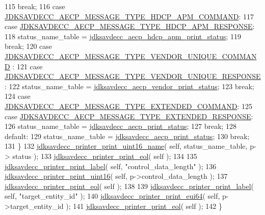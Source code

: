 \begin{DoxyCode}
115         \textcolor{keywordflow}{break};
116     \textcolor{keywordflow}{case} \hyperlink{group__aecp__message__type_gad8bc8a9baa1622bd8eb8077cfc7683da}{JDKSAVDECC\_AECP\_MESSAGE\_TYPE\_HDCP\_APM\_COMMAND}:
117     \textcolor{keywordflow}{case} \hyperlink{group__aecp__message__type_gabea02eb162583796abf33a90b4f7bc4f}{JDKSAVDECC\_AECP\_MESSAGE\_TYPE\_HDCP\_APM\_RESPONSE}:
118         status\_name\_table = \hyperlink{group__aecp__print_gabd6228d42e89612d3e6f1753949893e6}{jdksavdecc\_aecp\_hdcp\_apm\_print\_status};
119         \textcolor{keywordflow}{break};
120     \textcolor{keywordflow}{case} \hyperlink{group__aecp__message__type_gacab73895959eb753b503adc28096fdd5}{JDKSAVDECC\_AECP\_MESSAGE\_TYPE\_VENDOR\_UNIQUE\_COMMAND}
      :
121     \textcolor{keywordflow}{case} \hyperlink{group__aecp__message__type_ga0ae19013f80cab20e33bdc804b7f1364}{JDKSAVDECC\_AECP\_MESSAGE\_TYPE\_VENDOR\_UNIQUE\_RESPONSE}
      :
122         status\_name\_table = \hyperlink{group__aecp__print_gaca25183a2710580e271aa36225535463}{jdksavdecc\_aecp\_vendor\_print\_status};
123         \textcolor{keywordflow}{break};
124     \textcolor{keywordflow}{case} \hyperlink{group__aecp__message__type_ga3e49dd85a1e6d1ef5f18fad578c048f4}{JDKSAVDECC\_AECP\_MESSAGE\_TYPE\_EXTENDED\_COMMAND}:
125     \textcolor{keywordflow}{case} \hyperlink{group__aecp__message__type_ga81cc685902a06aa709023d5e9283d097}{JDKSAVDECC\_AECP\_MESSAGE\_TYPE\_EXTENDED\_RESPONSE}:
126         status\_name\_table = \hyperlink{group__aecp__print_ga3f478fcbbe933768f463bef56b4d98a8}{jdksavdecc\_aecp\_print\_status};
127         \textcolor{keywordflow}{break};
128     \textcolor{keywordflow}{default}:
129         status\_name\_table = \hyperlink{group__aecp__print_ga3f478fcbbe933768f463bef56b4d98a8}{jdksavdecc\_aecp\_print\_status};
130         \textcolor{keywordflow}{break};
131     \}
132     \hyperlink{group__util_ga62486d864a66773d19bbbe23cebf346a}{jdksavdecc\_printer\_print\_uint16\_name}( \textcolor{keyword}{self}, status\_name\_table, p->
      status );
133     \hyperlink{group__util_gacda56c9d3d24593a52c999682fa6e6e3}{jdksavdecc\_printer\_print\_eol}( \textcolor{keyword}{self} );
134 
135     \hyperlink{group__util_gaf7818b24143b3c7502926a425a242ff5}{jdksavdecc\_printer\_print\_label}( \textcolor{keyword}{self}, \textcolor{stringliteral}{"control\_data\_length"} );
136     \hyperlink{group__util_ga9793e0ff8e7ed25d957282ee6b257ce2}{jdksavdecc\_printer\_print\_uint16}( \textcolor{keyword}{self}, p->control\_data\_length );
137     \hyperlink{group__util_gacda56c9d3d24593a52c999682fa6e6e3}{jdksavdecc\_printer\_print\_eol}( \textcolor{keyword}{self} );
138 
139     \hyperlink{group__util_gaf7818b24143b3c7502926a425a242ff5}{jdksavdecc\_printer\_print\_label}( \textcolor{keyword}{self}, \textcolor{stringliteral}{"target\_entity\_id"} );
140     \hyperlink{group__util_gafdf65e002e889f4fc89db5d1e532eaa3}{jdksavdecc\_printer\_print\_eui64}( \textcolor{keyword}{self}, p->target\_entity\_id );
141     \hyperlink{group__util_gacda56c9d3d24593a52c999682fa6e6e3}{jdksavdecc\_printer\_print\_eol}( \textcolor{keyword}{self} );
142 \}
\end{DoxyCode}


